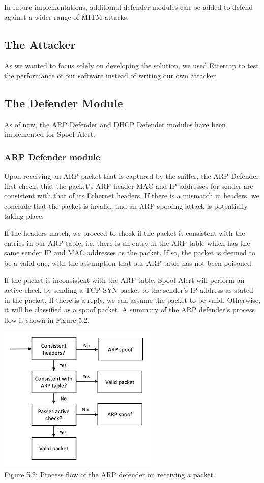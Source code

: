 \documentclass{acm_proc_article-sp}
\begin{document}
In future implementations, additional defender modules can be added to defend against a wider range of MITM attacks.

\subsection{The Attacker}

As we wanted to focus solely on developing the solution, we used Ettercap to test the performance of our software instead of writing our own attacker.  

\subsection{The Defender Module}

As of now, the ARP Defender and DHCP Defender modules have been implemented for Spoof Alert.

\subsubsection{ARP Defender module}

Upon receiving an ARP packet that is captured by the sniffer, the ARP Defender first checks that the packet's ARP header MAC and IP addresses for sender are consistent with that of its Ethernet headers. If there is a mismatch in headers, we conclude that the packet is invalid, and an ARP spoofing attack is potentially taking place.

If the headers match, we proceed to check if the packet is consistent with the entries in our ARP table, i.e. there is an entry in the ARP table which has the same sender IP and MAC addresses as the packet. If so, the packet is deemed to be a valid one, with the assumption that our ARP table has not been poisoned.

If the packet is inconsistent with the ARP table, Spoof Alert will perform an active check by sending a TCP SYN packet to the sender's IP address as stated in the packet. If there is a reply, we can assume the packet to be valid. Otherwise, it will be classified as a spoof packet.
A summary of the ARP defender’s process flow is shown in Figure 5.2.

\includegraphics[width=3in]{architecture02.png} \\
Figure 5.2: Process flow of the ARP defender on receiving a packet.
\end{document}
